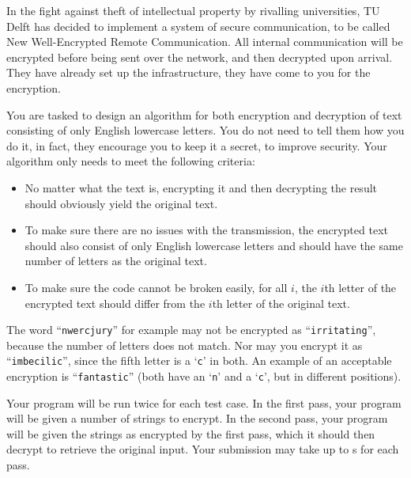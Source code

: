 \problemname{}


\newcommand{\maxn}{1000}
\newcommand{\maxlen}{100}

In the fight against theft of intellectual property by rivalling universities, TU Delft has decided to implement a system of secure communication, to be called New Well-Encrypted Remote Communication. All internal communication will be encrypted before being sent over the network, and then decrypted upon arrival. They have already set up the infra\-structure, they have come to you for the encryption.

You are tasked to design an algorithm for both encryption and decryption of text consisting of only English lowercase letters. You do not need to tell them how you do it, in fact, they encourage you to keep it a secret, to improve security. Your algorithm only needs to meet the following criteria:
\begin{itemize}
	\item No matter what the text is, encrypting it and then decrypting the result should obviously yield the original text.
	\item To make sure there are no issues with the transmission, the encrypted text should also consist of only English lowercase letters and should have the same number of letters as the original text.
	\item To make sure the code cannot be broken easily, for all $i$, the $i$th letter of the encrypted text should differ from the $i$th letter of the original text.
\end{itemize}

The word ``\texttt{nwercjury}'' for example may not be encrypted as ``\texttt{irritating}'', because the number of letters does not match. Nor may you encrypt it as ``\texttt{imbecilic}'', since the fifth letter is a `\texttt{c}' in both. An example of an acceptable encryption is ``\texttt{fantastic}'' (both have an `\texttt{n}' and a `\texttt{c}', but in different positions).

Your program will be run twice for each test case.
In the first pass, your program will be given a number of strings to encrypt.
In the second pass, your program will be given the strings as encrypted by
the first pass, which it should then decrypt to retrieve the original input.
Your submission may take up to \timelimit{}s for each pass.

